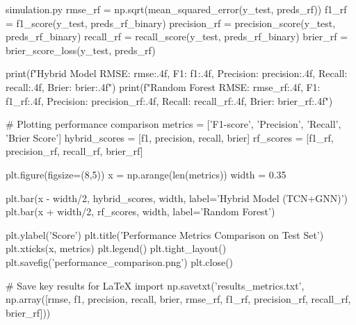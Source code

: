 \begin{filecontents*}{simulation.py}
rmse_rf = np.sqrt(mean_squared_error(y_test, preds_rf))
f1_rf = f1_score(y_test, preds_rf_binary)
precision_rf = precision_score(y_test, preds_rf_binary)
recall_rf = recall_score(y_test, preds_rf_binary)
brier_rf = brier_score_loss(y_test, preds_rf)

print(f"Hybrid Model RMSE: {rmse:.4f}, F1: {f1:.4f}, Precision: {precision:.4f}, Recall: {recall:.4f}, Brier: {brier:.4f}")
print(f"Random Forest RMSE: {rmse_rf:.4f}, F1: {f1_rf:.4f}, Precision: {precision_rf:.4f}, Recall: {recall_rf:.4f}, Brier: {brier_rf:.4f}")

# Plotting performance comparison
metrics = ['F1-score', 'Precision', 'Recall', 'Brier Score']
hybrid_scores = [f1, precision, recall, brier]
rf_scores = [f1_rf, precision_rf, recall_rf, brier_rf]

plt.figure(figsize=(8,5))
x = np.arange(len(metrics))
width = 0.35

plt.bar(x - width/2, hybrid_scores, width, label='Hybrid Model (TCN+GNN)')
plt.bar(x + width/2, rf_scores, width, label='Random Forest')

plt.ylabel('Score')
plt.title('Performance Metrics Comparison on Test Set')
plt.xticks(x, metrics)
plt.legend()
plt.tight_layout()
plt.savefig('performance_comparison.png')
plt.close()

# Save key results for LaTeX import
np.savetxt('results_metrics.txt', np.array([rmse, f1, precision, recall, brier, rmse_rf, f1_rf, precision_rf, recall_rf, brier_rf]))
\end{filecontents*}

